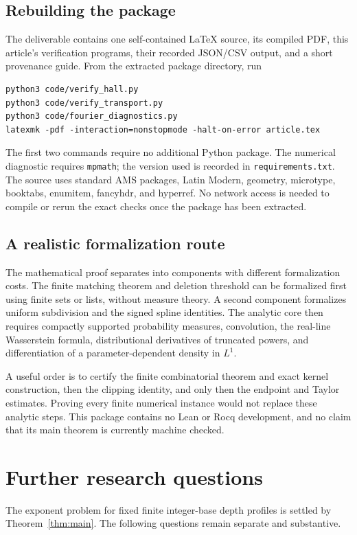 \documentclass[11pt,letterpaper]{article}
\theoremstyle{definition}
\theoremstyle{remark}
\begin{document}
\subsection{Rebuilding the package}
The deliverable contains one self-contained LaTeX source, its compiled PDF, this article's verification programs, their recorded JSON/CSV output, and a short provenance guide. From the extracted package directory, run
\begin{verbatim}
python3 code/verify_hall.py
python3 code/verify_transport.py
python3 code/fourier_diagnostics.py
latexmk -pdf -interaction=nonstopmode -halt-on-error article.tex
\end{verbatim}
The first two commands require no additional Python package. The numerical diagnostic requires \texttt{mpmath}; the version used is recorded in \texttt{requirements.txt}. The source uses standard AMS packages, Latin Modern, geometry, microtype, booktabs, enumitem, fancyhdr, and hyperref. No network access is needed to compile or rerun the exact checks once the package has been extracted.

\subsection{A realistic formalization route}
The mathematical proof separates into components with different formalization costs. The finite matching theorem and deletion threshold can be formalized first using finite sets or lists, without measure theory. A second component formalizes uniform subdivision and the signed spline identities. The analytic core then requires compactly supported probability measures, convolution, the real-line Wasserstein formula, distributional derivatives of truncated powers, and differentiation of a parameter-dependent density in $L^1$.

A useful order is to certify the finite combinatorial theorem and exact kernel construction, then the clipping identity, and only then the endpoint and Taylor estimates. Proving every finite numerical instance would not replace these analytic steps. This package contains no Lean or Rocq development, and no claim that its main theorem is currently machine checked.

\section{Further research questions}\label{sec:questions}

The exponent problem for fixed finite integer-base depth profiles is settled by Theorem~\ref{thm:main}. The following questions remain separate and substantive.
\end{document}
